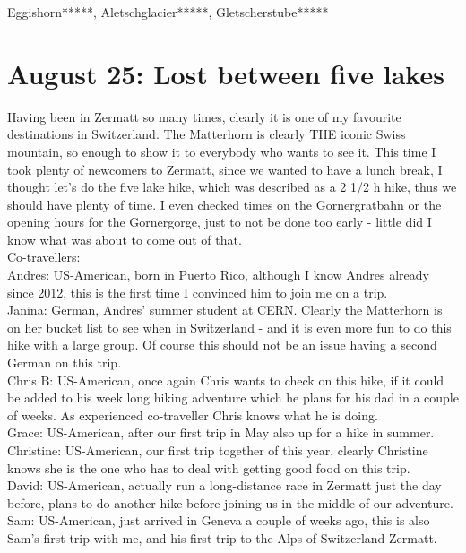 Eggishorn*****, Aletschglacier*****, Gletscherstube***** 

\section{August 25: Lost between five lakes}
\label{2019:Zermatt}

Having been in Zermatt so many times, clearly it is one of my favourite destinations in Switzerland. The Matterhorn is clearly THE iconic Swiss mountain, so enough to show it to everybody who wants to see it. This time I took plenty of newcomers to Zermatt, since we wanted to have a lunch break, I thought let's do the five lake hike, which was described as a 2 1/2 h hike, thus we should have plenty of time. I even checked times on the Gornergratbahn or the opening hours for the Gornergorge, just to not be done too early - little did I know what was about to come out of that.\\

Co-travellers:\\
Andres: US-American, born in Puerto Rico, although I know Andres already since 2012, this is the first time I convinced him to join me on a trip.\\
Janina: German, Andres' summer student at CERN. Clearly the Matterhorn is on her bucket list to see when in Switzerland - and it is even more fun to do this hike with a large group. Of course this should not be an issue having a second German on this trip.\\
Chris B: US-American, once again Chris wants to check on this hike, if it could be added to his week long hiking adventure which he plans for his dad in a couple of weeks. As experienced co-traveller Chris knows what he is doing.\\
Grace: US-American, after our first trip in May also up for a hike in summer.\\
Christine: US-American, our first trip together of this year, clearly Christine knows she is the one who has to deal with getting good food on this trip.\\
David: US-American, actually run a long-distance race in Zermatt just the day before, plans to do another hike before joining us in the middle of our adventure.\\
Sam: US-American, just arrived in Geneva a couple of weeks ago, this is also Sam's first trip with me, and his first trip to the Alps of Switzerland Zermatt.\\

